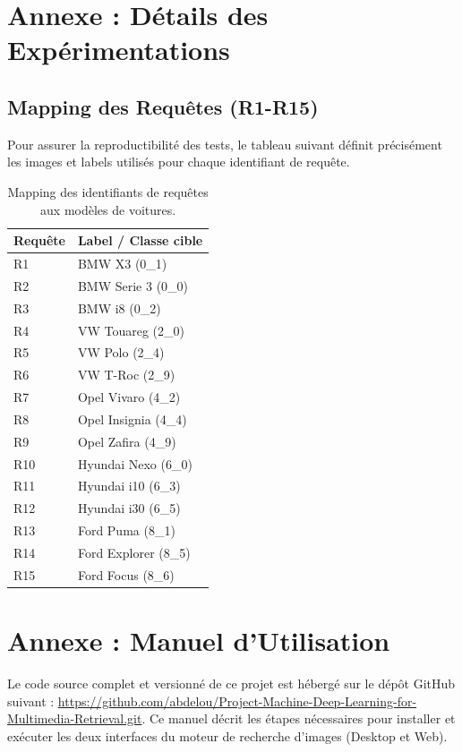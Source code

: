 \documentclass[a4paper,12pt]{report}%
\begin{document}
\appendix
\chapter{Annexe : Détails des Expérimentations}

\section{Mapping des Requêtes (R1-R15)}
Pour assurer la reproductibilité des tests, le tableau suivant définit précisément les images et labels utilisés pour chaque identifiant de requête.

\begin{table}[H]
    \centering
    \begin{tabular}{|l|l|}
    \hline
    \textbf{Requête} & \textbf{Label / Classe cible} \\ \hline
    R1 & BMW X3 (0\_1) \\ \hline
    R2 & BMW Serie 3 (0\_0) \\ \hline
    R3 & BMW i8 (0\_2) \\ \hline
    R4 & VW Touareg (2\_0) \\ \hline
    R5 & VW Polo (2\_4) \\ \hline
    R6 & VW T-Roc (2\_9) \\ \hline
    R7 & Opel Vivaro (4\_2) \\ \hline
    R8 & Opel Insignia (4\_4) \\ \hline
    R9 & Opel Zafira (4\_9) \\ \hline
    R10 & Hyundai Nexo (6\_0) \\ \hline
    R11 & Hyundai i10 (6\_3) \\ \hline
    R12 & Hyundai i30 (6\_5) \\ \hline
    R13 & Ford Puma (8\_1) \\ \hline
    R14 & Ford Explorer (8\_5) \\ \hline
    R15 & Ford Focus (8\_6) \\ \hline
    \end{tabular}
    \caption{Mapping des identifiants de requêtes aux modèles de voitures.}
    \label{tab:mapping}
\end{table}

\chapter{Annexe : Manuel d'Utilisation}

Le code source complet et versionné de ce projet est hébergé sur le dépôt GitHub suivant : \url{https://github.com/abdelou/Project-Machine-Deep-Learning-for-Multimedia-Retrieval.git}. Ce manuel décrit les étapes nécessaires pour installer et exécuter les deux interfaces du moteur de recherche d'images (Desktop et Web).
\end{document}
